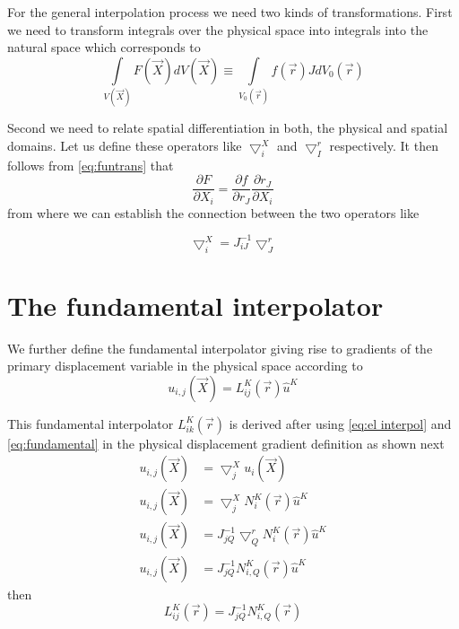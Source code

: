 For the general interpolation process we need two kinds of transformations.  First we need to transform integrals over the physical space into integrals into the natural space which corresponds to
\begin{equation}
\int\limits_{V(\vec{X})} F(\vec{X})dV(\vec{X})\equiv \int\limits_{V_0(\vec{r})} f(\vec{r})J dV_0(\vec{r})
\label{gen trans}
\end{equation}



Second we need to relate spatial differentiation in both, the physical and spatial domains.  Let us define these operators like $\bigtriangledown_i^X$ and $\bigtriangledown_I^r$ respectively. It then follows from \cref{eq:funtrans} that
\begin{equation}
\dfrac{\partial F}{\partial X_i}=\dfrac{\partial f}{\partial r_J}\dfrac{\partial r_J}{\partial X_i}
\label{eq:chain}
\end{equation}
from where we can establish the connection between the two operators like


\begin{equation}
\bigtriangledown_i^X=J_{iJ}^{-1}\bigtriangledown_J^r
\label{eq:fundamental}
\end{equation}


\section*{The fundamental interpolator}
We further define the fundamental interpolator giving rise to gradients of the primary displacement variable in the physical space according to
\begin{equation}
u_{i,j}(\vec{X})=L_{ij}^K(\vec{r})\hat{u}^K
\label{eq:fund operator}
\end{equation}


This fundamental interpolator  $L_{ik}^K(\vec{r})$ is derived after using \cref{eq:el interpol} and \cref{eq:fundamental} in the physical displacement gradient definition as shown next
\begin{align*}
u_{i,j}(\vec{X})&=\bigtriangledown_j^X u_i(\vec{X})\\
u_{i,j}(\vec{X})&=\bigtriangledown_j^X N_i^K(\vec{r})\hat{u}^K\\
u_{i,j}(\vec{X})&=J_{jQ}^{-1}\bigtriangledown_Q^r N_i^K(\vec{r})\hat{u}^K\\
u_{i,j}(\vec{X})&=J_{jQ}^{-1}N_{i,Q}^K(\vec{r})\hat{u}^K
\end{align*}
then
\begin{equation}
L_{ij}^K(\vec{r})=J_{jQ}^{-1}N_{i,Q}^K(\vec{r})
\label{eq:fundamental interpolator}
\end{equation}


